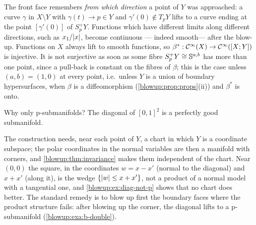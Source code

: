 \begin{discussion}
The front face remembers \emph{from which direction} a point of $Y$ was approached:
a curve $\gamma$ in $X\setminus Y$ with $\gamma(t)\to p\in Y$ and $\gamma'(0)\notin T_pY$
lifts to a curve ending at the point $[\gamma'(0)]$ of $S^+_pY$. Functions which have
different limits along different directions, such as $x_1/\lvert x\rvert$, become continuous ---
indeed smooth--- after the blow-up. Functions on $X$ always lift to smooth functions,
so $\beta^*:\mathcal{C}^\infty(X)\to\mathcal{C}^\infty([X;Y])$ is injective. It is not surjective as soon as some fibre
$S^+_pY\cong\mathbb{S}^{a,b}$ has more than one point, since a pull-back is constant on the
fibres of $\beta$; this is the case unless $(a,b)=(1,0)$ at every point, i.e.\ unless $Y$
is a union of boundary hypersurfaces, when $\beta$ is a diffeomorphism
(\cref{blowup:prop:props}(ii)) and $\beta^*$ is onto.
\end{discussion}

\begin{question}
Why only p-submanifolds? The diagonal of $[0,1]^2$ is a perfectly good submanifold.
\end{question}
\begin{answer}
The construction needs, near each point of $Y$, a chart in which $Y$ is a coordinate
subspace; the polar coordinates in the normal variables are then a manifold with corners,
and \cref{blowup:thm:invariance} makes them independent of the chart. Near $(0,0)$ the
square, in the coordinates $w=x-x'$ (normal to the diagonal) and $x+x'$ (along it), is the
wedge $\{\lvert w\rvert\le x+x'\}$, not a product of a normal model with a tangential one, and
\cref{blowup:ex:diag-not-p} shows that no chart does better. The standard remedy is to
blow up first the boundary faces where the product structure fails: after blowing up the
corner, the diagonal lifts to a p-submanifold (\cref{blowup:exa:b-double}).
\end{answer}

